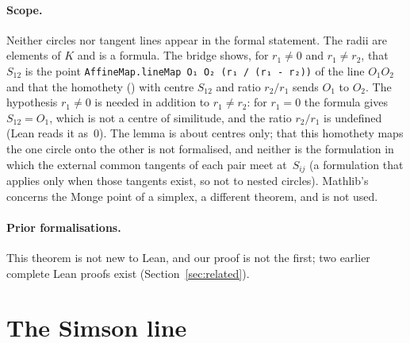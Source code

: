 \documentclass[11pt]{article}
\theoremstyle{definition}
\theoremstyle{remark}
\newcommand{\lean}[1]{\texttt{#1}}
\begin{document}
\paragraph{Scope.} Neither circles nor tangent lines appear in the formal statement. The radii are
elements of $K$ and  is a formula. The bridge 
shows, for $r_1\ne0$ and $r_1\ne r_2$, that $S_{12}$ is the point
\lean{AffineMap.lineMap O₁ O₂ (r₁ / (r₁ - r₂))} of the line $O_1O_2$ and that the homothety
() with centre $S_{12}$ and ratio $r_2/r_1$ sends $O_1$ to $O_2$. The
hypothesis $r_1\ne0$ is needed in addition to $r_1\ne r_2$: for $r_1=0$ the formula gives
$S_{12}=O_1$, which is not a centre of similitude, and the ratio $r_2/r_1$ is undefined (Lean reads
it as~$0$). The lemma is about centres only; that this homothety maps the one circle onto the other
is not formalised, and neither is the formulation in which the external common
tangents of each pair meet at~$S_{ij}$ (a formulation that applies only when those tangents
exist, so not to nested circles). Mathlib's 
concerns the Monge point of a simplex, a different theorem, and is not used.

\paragraph{Prior formalisations.} This theorem is not new to Lean, and our proof is not the first;
two earlier complete Lean proofs exist (Section~\ref{sec:related}).

\section{The Simson line}\label{sec:simson}
\end{document}
